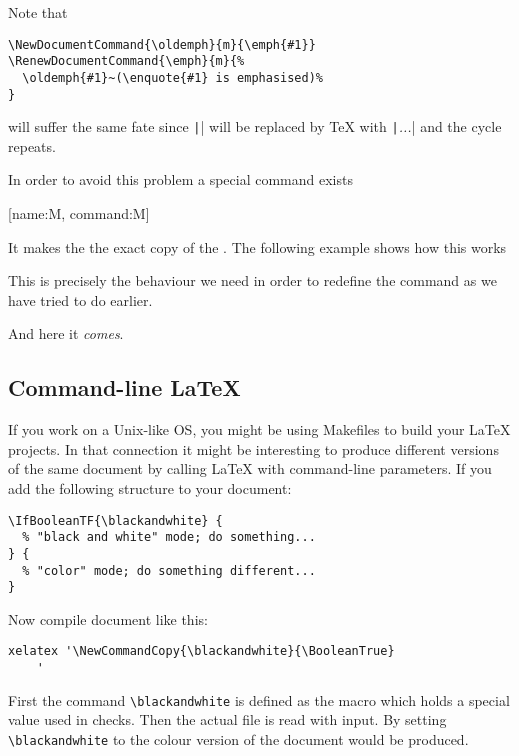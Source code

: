 Note that
\begin{verbatim}
\NewDocumentCommand{\oldemph}{m}{\emph{#1}}
\RenewDocumentCommand{\emph}{m}{%
  \oldemph{#1}~(\enquote{#1} is emphasised)%
}
\end{verbatim}
will suffer the same fate since \texttt|| %
will  be replaced by \TeX{} with \texttt|\emph{...}| and %
the  cycle repeats.

In order to avoid this problem a special command exists
\begin{lscommand}
  [name:M, command:M]
\end{lscommand}
It makes the  the exact copy of the . The following example shows how this works
\begin{example}[examplewidth=0.35\linewidth]

\NewDocumentCommand{\newfoo}{}{\foo}
\NewCommandCopy{\copiedfoo}{\foo}


\foo{} \newfoo{} \copiedfoo{}
\end{example}

This is precisely the behaviour we need in order to redefine the 
command as we have tried to do earlier.
\begin{example}[examplewidth=0.35\linewidth]
\NewCommandCopy{\oldemph}{\emph}

And here it \emph{comes}.
\end{example}

\subsection{Command-line \LaTeX}

If you work on a Unix-like OS, you might be using Makefiles to build your
\LaTeX{} projects. In that connection it might be interesting to produce
different versions of the same document by calling \LaTeX{} with command-line
parameters. If you add the following structure to your document:

\begin{verbatim}
\IfBooleanTF{\blackandwhite} {
  % "black and white" mode; do something...
} {
  % "color" mode; do something different...
}
\end{verbatim}

Now compile document like this:
\begin{verbatim}
xelatex '\NewCommandCopy{\blackandwhite}{\BooleanTrue}
    '
\end{verbatim}
First the command \verb|\blackandwhite| is defined as the  macro which
holds a special value used in  checks. Then the actual file is
read with input. By setting \verb|\blackandwhite| to  the
colour version of the document would be produced.

